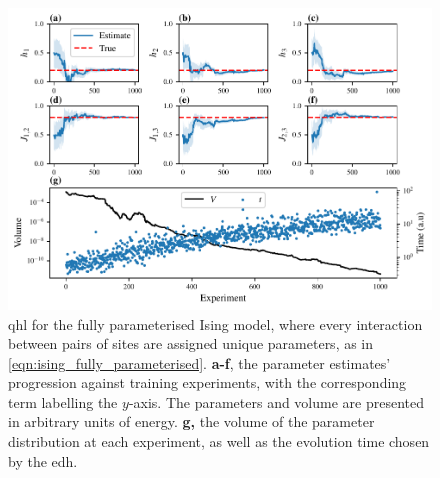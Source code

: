 \begin{figure}
    \begin{center}
        \includegraphics{theoretical_study/figures/fully_param_ising_qhl.pdf}
    \end{center}
    \caption[ for the fully parameterised Ising model]{
        \Acrlong{qhl} for the fully parameterised Ising model, 
            where every interaction between pairs of sites are assigned unique parameters, 
            as in \cref{eqn:ising_fully_parameterised}. 
        \textbf{a-f}, the parameter estimates' progression against training \glspl{experiment}, 
            with the corresponding term labelling the $y$-axis. 
            The parameters and volume are presented in arbitrary units of energy. 
        \textbf{g,} the \gls{volume} of the parameter distribution at each experiment, 
            as well as the evolution time chosen by the \gls{edh}.  
        \figtableref
    }
    \label{fig:ising_fully_parameterised}
\end{figure}

